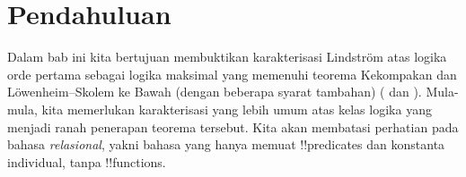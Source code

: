 \documentclass[../../../include/open-logic-section]{subfiles}
\begin{document}
\section{Pendahuluan}

Dalam bab ini kita bertujuan membuktikan karakterisasi Lindstr\"om atas
logika orde pertama sebagai logika maksimal yang memenuhi teorema Kekompakan
dan L\"owenheim--Skolem ke Bawah (dengan beberapa syarat tambahan)
( dan
). Mula-mula, kita memerlukan
karakterisasi yang lebih umum atas kelas logika yang menjadi ranah penerapan
teorema tersebut. Kita akan membatasi perhatian pada bahasa
\emph{relasional}, yakni bahasa yang hanya memuat !!{predicate}s dan
konstanta individual, tanpa !!{function}s.
\end{document}
